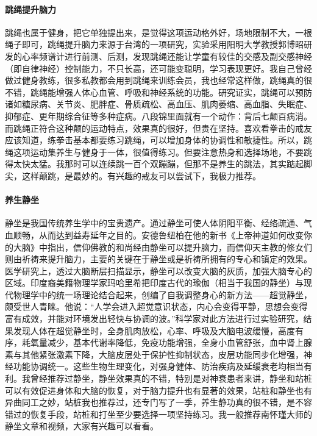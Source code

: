 \documentclass{ctexart}
\begin{document}
\paragraph{跳绳提升脑力} 跳绳也属于健身，把它单独提出来，是觉得这项运动格外好，场地限制不大，一根绳子即可，跳绳提升脑力来源于台湾的一项研究，实验采用阳明大学教授郭博昭研发的心率频谱计进行前测、后测，发现跳绳还能让学童有较佳的交感及副交感神经（即自律神经）控制能力，不只长高，还可能变聪明，学习表现更好。我自己曾经做过健身教练，很多私教都会用到跳绳来训练会员，我也经常这样做，跳绳真的很不错，跳绳能增强人体心血管、呼吸和神经系统的功能。研究证实，跳绳可以预防诸如糖尿病、关节炎、肥胖症、骨质疏松、高血压、肌肉萎缩、高血脂、失眠症、抑郁症、更年期综合征等多种症病。八段锦里面就有一个动作：背后七颠百病消。而跳绳正符合这种颠的运动特点，效果真的很好，但贵在坚持。喜欢看拳击的戒友应该知道，练拳击基本都要练习跳绳，可以增加身体的协调性和敏捷性。所以，跳绳这项运动集养生与健身于一体，很值得练习。但要注意热身和选择场地，不要跳得太快太猛。我那时可以连续跳一百个双蹦蹦，但那不是养生的跳法，其实踮起脚尖，这样颠跳，是最妙的。有兴趣的戒友可以尝试下，我极力推荐。

\paragraph{养生静坐} 静坐是我国传统养生学中的宝贵遗产。通过静坐可使人体阴阳平衡、经络疏通、气血顺畅，从而达到益寿延年之目的。安德鲁纽柏在他的新书《上帝神道如何改变你的大脑》中指出，信仰佛教的和尚经由静坐可以提升脑力，而信仰天主教的修女们则由祈祷来提升脑力，主要的关键在于静坐或是祈祷所拥有的专心和镇定的效果。医学研究上，透过大脑断层扫描显示，静坐可以改变大脑的灰质，加强大脑专心的区域。印度裔美籍物理学家玛哈里希把印度古代的瑜伽（相当于我国的静坐）与现代物理学中的统一场理论结合起来，创编了自我调整身心的新方法——超觉静坐，颇受世人青睐。他说：“人学会进入超觉意识状态，内心会变得平静，思想会变得富有成效，并能对环境发出轻快与协调的波。”科学家对此方法进行过实验研究，结果发现人体在超觉静坐时，全身肌肉放松，心率、呼吸及大脑电波缓慢，高度有序，耗氧量减少，基本代谢率降低，免疫功能增强，全身小血管舒张，血中肾上腺素与其他紧张激素下降，大脑皮层处于保护性抑制状态，皮层功能同步化增强，神经功能协调统一。这些生物生理变化，对强身健体、防治疾病及延缓衰老均相当有利。我曾经推荐过静坐，静坐效果真的不错，特别是对神衰患者来讲，静坐和站桩可以有效促进身体和大脑的恢复，对于脑力提升也有显著的效果，站桩和静坐也有异曲同工之妙，站桩我也推荐过，还专门写了一季，养生静功真的很不错，是不容错过的恢复手段，站桩和打坐至少要选择一项坚持练习。我一般推荐南怀瑾大师的静坐文章和视频，大家有兴趣可以看看。
\end{document}
